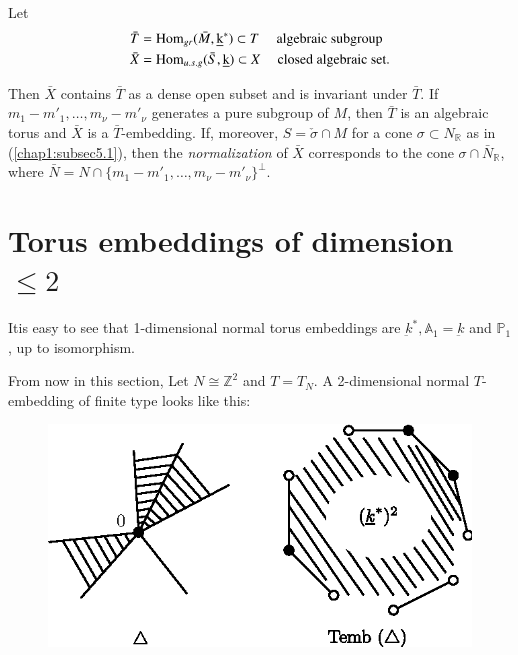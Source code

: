  Let 
 \begin{align*}
\bar{T}&=\operatorname{Hom}_{gr}( \bar{M}, \underbar{k}^*) \subset T \quad\text{
  algebraic subgroup}\\ 
\bar{X}&= \operatorname{Hom}_{u.s.g}(\bar{S}, \underbar{k}) \subset X \quad\text{
  closed algebraic set}. 
 \end{align*} 
 
 Then $\bar{X}$ contains $\bar{T}$ as a dense open  subset and is
 invariant under $\bar{T}$. If $m_1- m'_1, \ldots , m_\nu - m'_\nu$
 generates a pure subgroup of $M$, then $\bar{T}$ is an algebraic
 torus and $\bar{X}$ is a $\bar{T}$-embedding. If, moreover, $S=
 \check{\sigma} \cap M$ for a cone $\sigma \subset N_{\mathbb{R}}$ as
 in (\ref{chap1:subsec5.1}), then the \textit{ normalization } of $\bar{X}$
 corresponds to the cone $\sigma \cap \bar{N}_\mathbb{R}$, where
 $\bar{N}= N \cap \{m_1-m'_1, \ldots , m_\nu- m'_\nu \}^\perp$.
 
 \section{Torus embeddings of dimension $\le 2$}\label{chap1:sec8}
 
 It\pageoriginale is easy to see that 1-dimensional normal torus
 embeddings are 
 $\underbar{k}^*, \mathbb{A}_1 = \underbar{k}$ and $\mathbb{P}_1$, up
 to isomorphism.  
 
 \medskip
 From  now in this section, Let $N \cong \mathbb{Z}^2$ and $T=T_N$. A
 2-dimensional normal $T$-embedding of finite type looks like this:  
\begin{figure}[H]
\centering 
\includegraphics{vol58-fig/fig58-11.eps} 
\end{figure}

